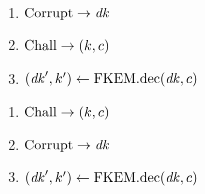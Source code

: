 \parbox[t]{5cm}{%
    \begin{enumerate}[topsep=0pt]
        \item $\mathrm{Corrupt}\to\mathit{dk}$
        \item $\mathrm{Chall}\to(k,c)$
        \item $(\mathit{dk}',k')\gets\mathrm{FKEM}.\mathrm{dec}(\mathit{dk},c)$
    \end{enumerate}
}\parbox[t]{5cm}{%
    \begin{enumerate}[topsep=0pt]
        \item $\mathrm{Chall}\to(k,c)$
        \item $\mathrm{Corrupt}\to\mathit{dk}$
        \item $(\mathit{dk}',k')\gets\mathrm{FKEM}.\mathrm{dec}(\mathit{dk},c)$
    \end{enumerate}
}